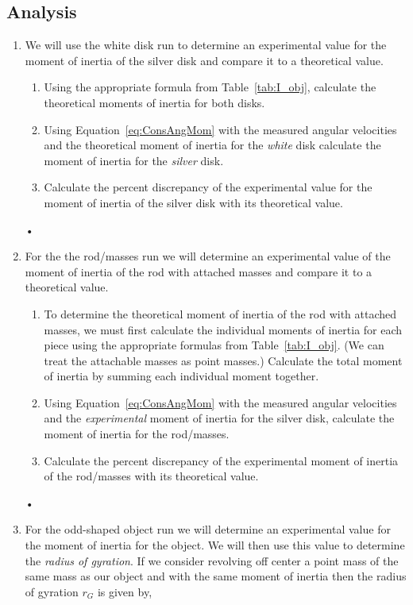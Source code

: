 \documentclass[main.tex]{subfiles}
\begin{document}
\subsection*{Analysis}
\begin{enumerate}
\item
We will use the white disk run to determine an experimental value for the moment of inertia of the silver disk and compare it to a theoretical value.
\begin{enumerate}
\item
Using the appropriate formula from Table~\ref{tab:I_obj}, calculate the theoretical moments of inertia for both disks.
\item
Using Equation~\eqref{eq:ConsAngMom} with the measured angular velocities and the theoretical moment of inertia for the \emph{white} disk calculate the moment of inertia for the \emph{silver} disk.
\item
Calculate the percent discrepancy of the experimental value for the moment of inertia of the silver disk with its theoretical value.
\end{enumerate}•
\item \label{step:Rod}
For the the rod/masses run we will determine an experimental value of the moment of inertia of the rod with attached masses and compare it to a theoretical value.
\begin{enumerate}
\item
To determine the theoretical moment of inertia of the rod with attached masses, we must first calculate the individual moments of inertia for each piece using the appropriate formulas from Table~\ref{tab:I_obj}. (We can treat the attachable masses as point masses.) Calculate the total moment of inertia by  summing each individual moment together.
\item
Using Equation~\eqref{eq:ConsAngMom} with the measured angular velocities and the \emph{experimental} moment of inertia for the silver disk, calculate the moment of inertia for the rod/masses.
\item
Calculate the percent discrepancy of the experimental moment of inertia of the rod/masses with its theoretical value.
\end{enumerate}•
\item
For the odd-shaped object run we will determine an experimental value for the moment of inertia for the object. We will then use this value to determine the \emph{radius of gyration}. If we consider revolving off center a point mass of the same mass as our object and with the same moment of inertia then the radius of gyration $r_G$ is given by,

\end{enumerate}
\end{document}
